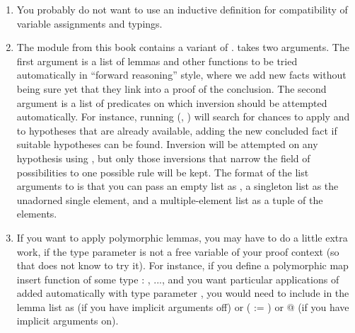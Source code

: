 \documentclass[12pt]{report}
\begin{document}
\begin{enumerate}
\begin{enumerate}
\coqdocemptyline
    
    \item You probably do not want to use an inductive definition for compatibility of variable assignments and typings.
    \item The  module from this book contains a variant  of .   takes two arguments.  The first argument is a list of lemmas and other functions to be tried automatically in ``forward reasoning'' style, where we add new facts without being sure yet that they link into a proof of the conclusion.  The second argument is a list of predicates on which inversion should be attempted automatically.  For instance, running  (, )  will search for chances to apply  and  to hypotheses that are already available, adding the new concluded fact if suitable hypotheses can be found.  Inversion will be attempted on any hypothesis using , but only those inversions that narrow the field of possibilities to one possible rule will be kept.  The format of the list arguments to  is that you can pass an empty list as , a singleton list as the unadorned single element, and a multiple-element list as a tuple of the elements.
    \item If you want  to apply polymorphic lemmas, you may have to do a little extra work, if the type parameter is not a free variable of your proof context (so that  does not know to try it).  For instance, if you define a polymorphic map insert function  of some type \coqdockw{\ensuremath{\forall}}  : , ..., and you want particular applications of  added automatically with type parameter , you would need to include  in the lemma list as   (if you have implicit arguments off) or  ( := ) or @  (if you have implicit arguments on).
  \end{enumerate}






\end{enumerate}
\end{document}
